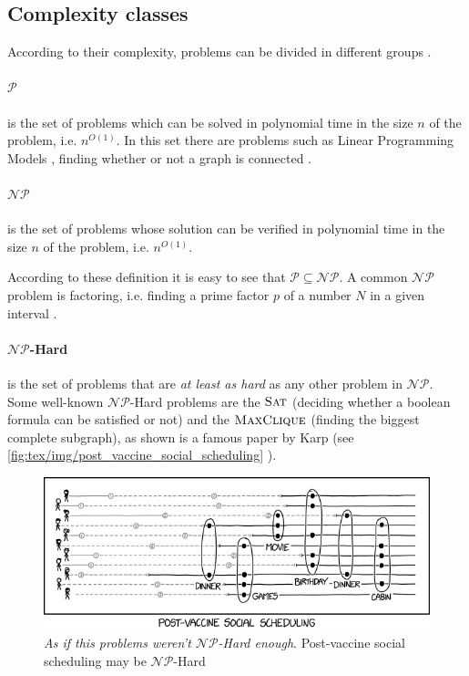 \subsection{Complexity classes}%
\label{par:complexity_classes}

According to their complexity, problems can be divided in different groups
\cite{DemaineFall2014}.

\paragraph{$\mathcal{P} $}%
\label{par:p}
is the set of problems which can be solved in polynomial time in the size $n$ of
the problem, i.e. $n^{O(1)} $. In this set there are problems such as Linear
Programming Models \cite{KHACHIYAN198053}\cite{Karmarkar1984}, finding whether
or not a graph is connected \cite{9780521884730}.

\paragraph{$\mathcal{NP} $}%
\label{par:np} is the set of problems whose solution can be verified in
polynomial time in the size $n$ of the problem, i.e. $n^{O(1)} $.

According to these definition it is easy to see that $\mathcal{P} \subseteq
	\mathcal{NP} $. A common $\mathcal{NP} $ problem is factoring, i.e. finding a
prime factor $p$ of a number $N$ in a given interval \cite{SanjeevArora2017}.

\paragraph{$\mathcal{NP} $-Hard}%
\label{par:_np_hard} is the set of problems that are \emph{at least as hard} as
any other problem in $\mathcal{NP} $. Some well-known $\mathcal{NP} $-Hard
problems are the $\textsc{Sat}$ (deciding whether a boolean formula can be
satisfied or not) and the $\textsc{MaxClique}$ (finding the biggest complete
subgraph), as shown is a famous paper by Karp \cite{Miller1972} (see
\autoref{fig:tex/img/post_vaccine_social_scheduling} ).

\begin{figure}[]
	\centering
	\includegraphics[width=0.8\linewidth]{tex/img/post_vaccine_social_scheduling.png}
	\caption{\emph{As if this problems weren't $\mathcal{NP} $-Hard enough}.
		Post-vaccine social scheduling may be $\mathcal{NP} $-Hard \cite{Munroe}}%
	\label{fig:tex/img/post_vaccine_social_scheduling}
\end{figure}

